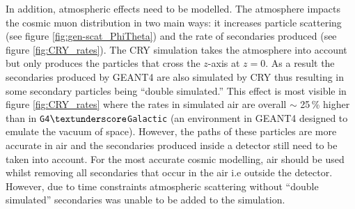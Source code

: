 In addition, atmospheric effects need to be modelled. The atmosphere impacts the cosmic muon distribution in two main ways: it increases particle scattering (see figure \ref{fig:gen-scat_PhiTheta}) and the rate of secondaries produced (see figure \ref{fig:CRY_rates}). The CRY simulation takes the atmosphere into account \cite{hagmann2007monteCry} but only produces the particles that cross the $z$-axis at $z = 0$. As a result the secondaries produced by GEANT4 are also simulated by CRY thus resulting in some secondary particles being ``double simulated.'' This effect is most visible in figure \ref{fig:CRY_rates} where the rates in simulated air are overall $\sim$ 25\,\% higher than in \texttt{G4$\textunderscore$Galactic} (an environment in GEANT4 designed to emulate the vacuum of space). However, the paths of these particles are more accurate in air and the secondaries produced inside a detector still need to be taken into account. For the most accurate cosmic modelling, air should be used whilst removing all secondaries that occur in the air i.e outside the detector. However, due to time constraints atmospheric scattering without ``double simulated'' secondaries was unable to be added to the simulation. 

